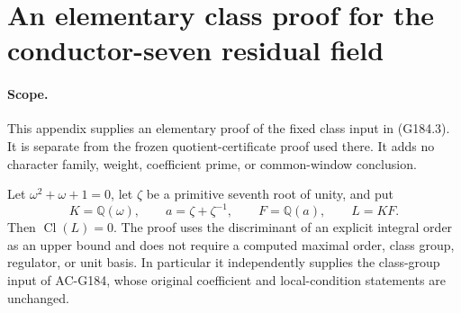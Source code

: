 \section{An elementary class proof for the conductor-seven residual field}
\label{sec:real7-cm-elementary-class}

\paragraph{Scope.}
This appendix supplies an elementary proof of the fixed class input
in (G184.3).  It is separate from the frozen quotient-certificate
proof used there.  It adds no character family, weight, coefficient
prime, or common-window conclusion.

\begin{theorem}
\label{AC-G185}
Let $\omega^2+\omega+1=0$, let $\zeta$ be a primitive seventh
root of unity, and put
\[
 K=\mathbb Q(\omega),\qquad
 a=\zeta+\zeta^{-1},\qquad
 F=\mathbb Q(a),\qquad L=KF.
 \tag{G185.1}
\]
Then $\operatorname{Cl}(L)=0$.  The proof uses the discriminant
of an explicit integral order as an upper bound and does not require
a computed maximal order, class group, regulator, or unit basis.
In particular it independently supplies the class-group input of
AC-G184, whose original coefficient and local-condition statements
are unchanged.
\end{theorem}

